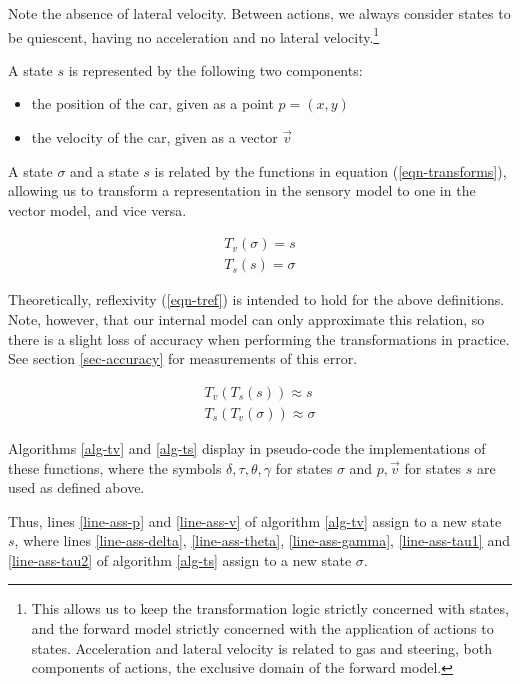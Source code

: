 \documentclass[conference]{IEEEtran}
\begin{document}
Note the absence of lateral velocity. Between actions, we always consider states to be quiescent, having no acceleration and no lateral velocity.\footnote{This allows us to keep the transformation logic strictly concerned with states, and the forward model strictly concerned with the application of actions to states. Acceleration and lateral velocity is related to gas and steering, both components of actions, the exclusive domain of the forward model.}

A state $s$ is represented by the following two components:
\begin{itemize}
\item the position of the car, given as a point $p=(x,y)$
\item the velocity of the car, given as a vector $\vec{v}$
\end{itemize}

A state $\sigma$ and a state $s$ is related by the functions in equation (\ref{eqn-transforms}), allowing us to transform a representation in the sensory model to one in the vector model, and vice versa.

\begin{equation}
\begin{alignedat}{1}
\label{eqn-transforms}
T_v (\sigma) = s \\
T_s (s) = \sigma
\end{alignedat}
\end{equation}

Theoretically, reflexivity (\ref{eqn-tref}) is intended to hold for the above definitions. Note, however, that our internal model can only approximate this relation, so there is a slight loss of accuracy when performing the transformations in practice. See section \ref{sec-accuracy} for measurements of this error.

\begin{equation}
\begin{alignedat}{1}
\label{eqn-tref}
T_v (T_s (s)) \approx s \\
T_s (T_v (\sigma)) \approx \sigma
\end{alignedat}
\end{equation}

Algorithms \ref{alg-tv} and \ref{alg-ts} display in pseudo-code the implementations of these functions, where the symbols $\delta, \tau, \theta, \gamma$ for states $\sigma$ and $p, \vec{v}$ for states $s$ are used as defined above.

Thus, lines \ref{line-ass-p} and \ref{line-ass-v} of algorithm \ref{alg-tv} assign to a new state $s$, where lines \ref{line-ass-delta}, \ref{line-ass-theta}, \ref{line-ass-gamma}, \ref{line-ass-tau1} and \ref{line-ass-tau2} of algorithm \ref{alg-ts} assign to a new state $\sigma$.
\end{document}
